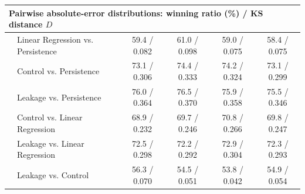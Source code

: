 \begin{table}[htbp]
{\begin{tabular}{llcccc}
\midrule
\multicolumn{6}{l}{\textbf{Pairwise absolute-error distributions: winning ratio (\%) / KS distance $D$}} \\
\midrule
	& Linear Regression vs. Persistence & 59.4 / 0.082 & 61.0 / 0.098 & 59.0 / 0.075 & 58.4 / 0.075 \\
 & Control vs. Persistence & 73.1 / 0.306 & 74.4 / 0.333 & 74.2 / 0.324 & 73.1 / 0.299 \\
 & Leakage vs. Persistence & 76.0 / 0.364 & 76.5 / 0.370 & 75.9 / 0.358 & 75.5 / 0.346 \\
 & Control vs. Linear Regression & 68.9 / 0.232 & 69.7 / 0.246 & 70.8 / 0.266 & 69.8 / 0.247 \\
 & Leakage vs. Linear Regression & 72.5 / 0.298 & 72.2 / 0.292 & 72.9 / 0.304 & 72.3 / 0.293 \\
 & Leakage vs. Control & 56.3 / 0.070 & 54.5 / 0.051 & 53.8 / 0.042 & 54.9 / 0.054 \\
\bottomrule
\end{tabular}%
}
\endgroup
\end{table}
